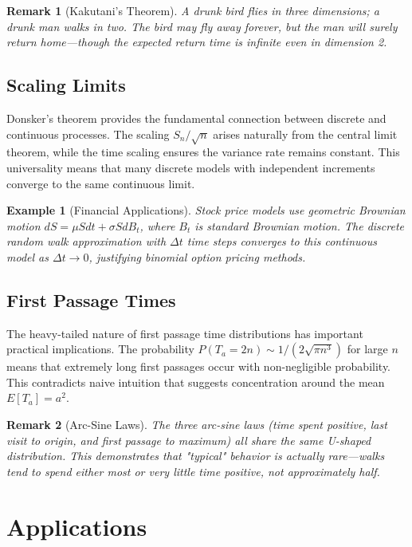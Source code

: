 \documentclass[a4paper, 11pt]{article}
\newtheorem{example}{Example}[section]
\newtheorem{remark}{Remark}[section]
\begin{document}
\begin{remark}[Kakutani's Theorem]
A drunk bird flies in three dimensions; a drunk man walks in two. The bird may fly away forever,
but the man will surely return home—though the expected return time is infinite even in dimension 2.
\end{remark}

\subsection{Scaling Limits}

Donsker's theorem provides the fundamental connection between discrete and continuous processes.
The scaling $S_n / \sqrt{n}$ arises naturally from the central limit theorem, while the time
scaling ensures the variance rate remains constant. This universality means that many discrete
models with independent increments converge to the same continuous limit.

\begin{example}[Financial Applications]
Stock price models use geometric Brownian motion $dS = \mu S dt + \sigma S dB_t$, where $B_t$
is standard Brownian motion. The discrete random walk approximation with $\Delta t$ time steps
converges to this continuous model as $\Delta t \to 0$, justifying binomial option pricing methods.
\end{example}

\subsection{First Passage Times}

The heavy-tailed nature of first passage time distributions has important practical implications.
The probability $P(T_a = 2n) \sim 1/(2\sqrt{\pi n^3})$ for large $n$ means that extremely long
first passages occur with non-negligible probability. This contradicts naive intuition that suggests
concentration around the mean $E[T_a] = a^2$.

\begin{remark}[Arc-Sine Laws]
The three arc-sine laws (time spent positive, last visit to origin, and first passage to maximum)
all share the same U-shaped distribution. This demonstrates that "typical" behavior is actually
rare—walks tend to spend either most or very little time positive, not approximately half.
\end{remark}

\section{Applications}
\end{document}
